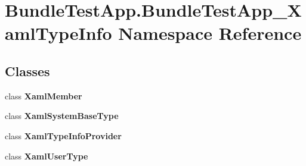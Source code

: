 \section{Bundle\+Test\+App.\+Bundle\+Test\+App\+\_\+\+Xaml\+Type\+Info Namespace Reference}
\label{namespace_bundle_test_app_1_1_bundle_test_app___xaml_type_info}
\subsection*{Classes}
\begin{DoxyCompactItemize}
\item 
class {\bfseries Xaml\+Member}
\item 
class {\bfseries Xaml\+System\+Base\+Type}
\item 
class {\bfseries Xaml\+Type\+Info\+Provider}
\item 
class {\bfseries Xaml\+User\+Type}
\end{DoxyCompactItemize}

